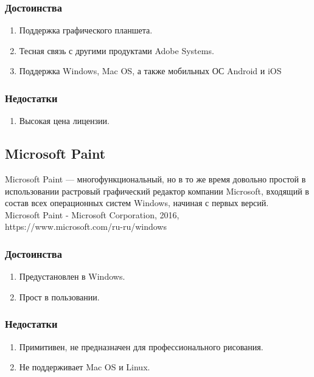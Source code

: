 \subsubsection{Достоинства}
\begin{enumerate}
	\item Поддержка графического планшета.
	\item Тесная связь с другими продуктами Adobe Systems.
	\item Поддержка Windows, Mac OS, а также мобильных ОС Android и iOS
\end{enumerate}

\subsubsection{Недостатки}
\begin{enumerate}
	\item Высокая цена лицензии.
\end{enumerate}

\subsection{Microsoft Paint}
Microsoft Paint — многофункциональный, но в то же время довольно простой в использовании растровый графический редактор компании Microsoft, входящий в состав всех операционных систем Windows, начиная с первых версий.\\
Microsoft Paint - Microsoft Corporation, 2016,\\
https://www.microsoft.com/ru-ru/windows\\

\subsubsection{Достоинства}
\begin{enumerate}
	\item Предустановлен в Windows.
	\item Прост в пользовании.
\end{enumerate}

\subsubsection{Недостатки}
\begin{enumerate}
	\item Примитивен, не предназначен для профессионального рисования.
	\item Не поддерживает Mac OS и Linux.
\end{enumerate}


